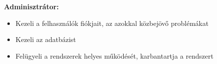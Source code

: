 \textbf{Adminisztrátor:}
\begin{itemize}
    \item Kezeli a felhasználók fiókjait, az azokkal közbejövő problémákat
    \item Kezeli az adatbázist
    \item Felügyeli a rendszerek helyes működését, karbantartja a rendszert
\end{itemize}






